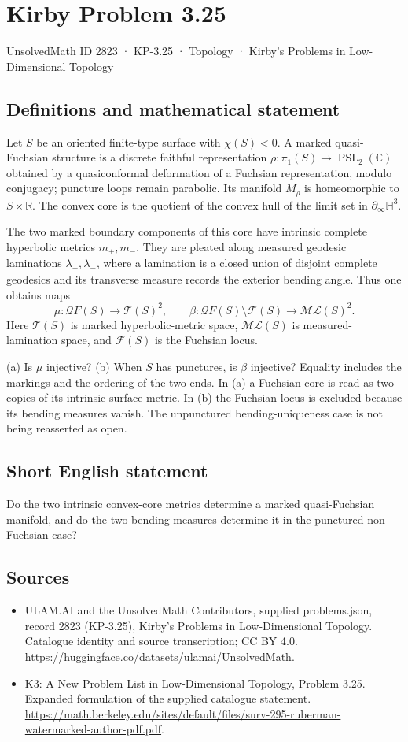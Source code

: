 \documentclass[11pt,a4paper]{article}
\begin{document}
\section*{Kirby Problem 3.25}\label{2823}
{\small UnsolvedMath ID 2823 · KP-3.25 · Topology · Kirby's Problems in Low-Dimensional Topology}
\subsection{Definitions and mathematical statement}
Let $S$ be an oriented finite-type surface with $\chi(S)<0$. A marked
quasi-Fuchsian structure is a discrete faithful representation
$\rho:\pi_1(S)\to\operatorname{PSL}_2(\mathbb C)$ obtained by a
quasiconformal deformation of a Fuchsian representation, modulo conjugacy;
puncture loops remain parabolic. Its manifold $M_\rho$ is homeomorphic to
$S\times\mathbb R$. The convex core is the quotient of the convex hull
of the limit set in $\partial_\infty\mathbb H^3$.

The two marked boundary components of this core have intrinsic complete
hyperbolic metrics $m_+,m_-$. They are pleated along measured geodesic
laminations $\lambda_+,\lambda_-$, where a lamination is a closed union
of disjoint complete geodesics and its transverse measure records the
exterior bending angle. Thus one obtains maps
\[
 \mu:\mathcal QF(S)\to\mathcal T(S)^2,\qquad
 \beta:\mathcal QF(S)\setminus\mathcal F(S)\to\mathcal{ML}(S)^2.
\]
Here $\mathcal T(S)$ is marked hyperbolic-metric space, $\mathcal{ML}(S)$
is measured-lamination space, and $\mathcal F(S)$ is the Fuchsian locus.

(a) Is $\mu$ injective? (b) When $S$ has punctures, is $\beta$ injective?
Equality includes the markings and the ordering of the two ends. In (a)
a Fuchsian core is read as two copies of its intrinsic surface metric.
In (b) the Fuchsian locus is excluded because its bending measures vanish.
The unpunctured bending-uniqueness case is not being reasserted as open.
\subsection{Short English statement}
Do the two intrinsic convex-core metrics determine a marked quasi-Fuchsian manifold, and do the two bending measures determine it in the punctured non-Fuchsian case?
\subsection{Sources}
\begin{itemize}
\item[S1] ULAM.AI and the UnsolvedMath Contributors, supplied problems.json, record 2823 (KP-3.25), Kirby's Problems in Low-Dimensional Topology. Catalogue identity and source transcription; CC BY 4.0.
\url{https://huggingface.co/datasets/ulamai/UnsolvedMath}.
\item[S2] K3: A New Problem List in Low-Dimensional Topology, Problem 3.25. Expanded formulation of the supplied catalogue statement.
\url{https://math.berkeley.edu/sites/default/files/surv-295-ruberman-watermarked-author-pdf.pdf}.
\end{itemize}
\end{document}
